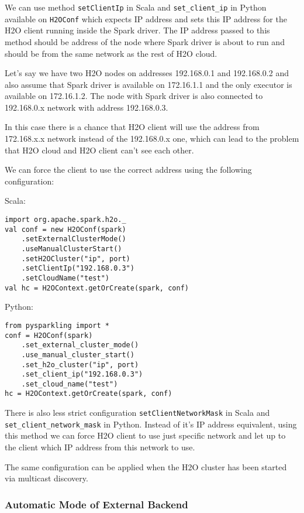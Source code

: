 We can use method \texttt{setClientIp} in Scala and \texttt{set\_client\_ip} in Python available on \texttt{H2OConf} which expects IP address and sets this IP address for the H2O client running inside the Spark driver. The IP address passed to this method should be address of the node where Spark driver is about to run and should be from the same network as the rest of H2O cloud.

Let's say we have two H2O nodes on addresses 192.168.0.1 and 192.168.0.2 and also assume that Spark driver is available on 172.16.1.1 and the only executor is available on 172.16.1.2. The node with Spark driver is also connected to 192.168.0.x network with address 192.168.0.3.

In this case there is a chance that H2O client will use the address from 172.168.x.x network instead of the 192.168.0.x one, which can lead to the problem that H2O cloud and H2O client can't see each other.

We can force the client to use the correct address using the following configuration:

Scala:
\begin{lstlisting}[style=Scala]
import org.apache.spark.h2o._
val conf = new H2OConf(spark)
    .setExternalClusterMode()
    .useManualClusterStart()
    .setH2OCluster("ip", port)
    .setClientIp("192.168.0.3")
    .setCloudName("test")
val hc = H2OContext.getOrCreate(spark, conf)
\end{lstlisting}

Python:
\begin{lstlisting}[style=Python]
from pysparkling import *
conf = H2OConf(spark)
    .set_external_cluster_mode()
    .use_manual_cluster_start()
    .set_h2o_cluster("ip", port)
    .set_client_ip("192.168.0.3")
    .set_cloud_name("test")
hc = H2OContext.getOrCreate(spark, conf)
\end{lstlisting}

There is also less strict configuration \texttt{setClientNetworkMask} in Scala and \texttt{set\_client\_network\_mask} in Python. Instead of it's IP address equivalent, using this method we can force H2O client to use just specific network and let up to the client which IP address from this network to use.

The same configuration can be applied when the H2O cluster has been started via multicast discovery.

\subsubsection{Automatic Mode of External Backend}

